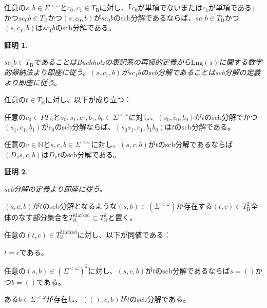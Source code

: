 \documentclass[dvipdfmx,uplatex]{jsarticle}
\theoremstyle{customnonumberbreakfortheorem}
\theoremstyle{customnonumberbreakforproof}
\newtheorem{hideableproof}{証明}
\begin{document}
\begin{proposition}[scb分解の置換可能性]\label{scb分解の置換可能性}
	任意の\(s,b \in \Sigma^{< \omega}\)と\(c_0, c_1 \in T_{\textrm{B}}\)に対し、「\(c_0\)が単項でないまたは\(c_1\)が単項である」かつ\(s c_0 b \in T_{\textrm{B}}\)かつ\((s,c_0,b)\)が\(s c_0 b\)のscb分解であるならば、\(s c_1 b \in T_{\textrm{B}}\)かつ\((s,c_1,b)\)は\(s c_1 b\)のscb分解である。
\end{proposition}

\begin{hideableproof}
	\begin{indented}
		\item \(s c_1 b \in T_{\textrm{B}}\)であることはBuchholzの表記系の再帰的定義から\(\textrm{Lng}(s)\)に関する数学的帰納法より即座に従う。\((s,c_1,b)\)が\(s c_1 b\)のscb分解であることはscb分解の定義より即座に従う。
	\end{indented}
\end{hideableproof}

\begin{proposition}[scb分解の合成則]\label{scb分解の合成則}
	任意の\(t \in T_{\textrm{B}}\)に対し、以下が成り立つ：
	\begin{penumerate}
		\item 任意の\(c_0 \in PT_{\textrm{B}}\)と\(s_0,s_1,c_1,b_1,b_0 \in \Sigma^{< \omega}\)に対し、\((s_0,c_0,b_0)\)が\(t\)のscb分解でかつ\((s_1,c_1,b_1)\)が\(c_0\)のscb分解ならば、\((s_0 s_1,c_1,b_1 b_0)\)は\(t\)のscb分解である。
		\item 任意の\(v \in \mathbb{N}\)と\(s,c,b \in \Sigma^{< \omega}\)に対し、\((s,c,b)\)が\(t\)のscb分解であるならば\((D_v s,c,b)\)は\(D_v t\)のscb分解である。
	\end{penumerate}
\end{proposition}

\begin{hideableproof}
	\begin{indented}
		\item scb分解の定義より即座に従う。
	\end{indented}
\end{hideableproof}

\((s,c,b)\)が\(t\)のscb分解となるような\((s,b) \in (\Sigma^{< \omega})\)が存在する\((t,c) \in T_{\textrm{B}}^2\)全体のなす部分集合を\(T_{\textrm{B}}^{\textrm{Marked}} \subset T_{\textrm{B}}^2\)と置く。

\begin{proposition}[scb分解の自明性の判定条件]\label{scb分解の自明性の判定条件}
	任意の\((t,c) \in T_{\textrm{B}}^{\textrm{Marked}}\)に対し、以下が同値である：
	\begin{penumerate}
		\item \(t = c\)である。
		\item 任意の\((s,b) \in (\Sigma^{< \omega})^2\)に対し、\((s,c,b)\)が\(t\)のscb分解であるならば\(s = ()\)かつ\(b = ()\)である。
		\item ある\(b \in \Sigma^{< \omega}\)が存在し、\(((),c,b)\)が\(t\)のscb分解である。
	\end{penumerate}
\end{proposition}
\end{document}

